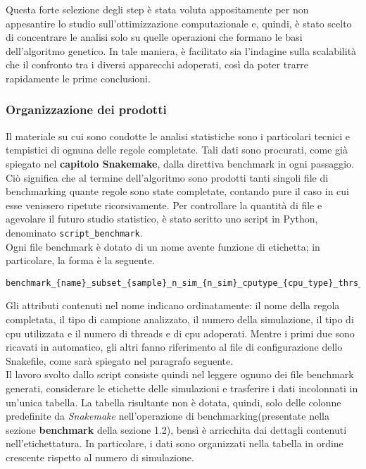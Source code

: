 Questa forte selezione degli step è stata voluta appositamente per non appesantire lo studio sull'ottimizzazione computazionale e, quindi, è stato scelto di concentrare le analisi solo su quelle operazioni che formano le basi dell'algoritmo genetico. In tale maniera, è facilitato sia l'indagine sulla scalabilità che il confronto tra i diversi apparecchi adoperati, così da poter trarre rapidamente le prime conclusioni.    


\subsubsection{Organizzazione dei prodotti}
Il materiale su cui sono condotte le analisi statistiche sono i particolari tecnici e tempistici di ognuna delle regole completate. Tali dati sono procurati, come già spiegato nel \textbf{capitolo Snakemake}, dalla direttiva benchmark in ogni passaggio. Ciò significa che al termine dell'algoritmo sono prodotti tanti singoli file di benchmarking quante regole sono state completate, contando pure il caso in cui esse venissero ripetute ricorsivamente. Per controllare la quantità di file e agevolare il futuro studio statistico, è stato scritto uno script in Python, denominato \verb!script_benchmark!. \\
Ogni file benchmark è dotato di un nome avente funzione di etichetta; in particolare, la forma è la seguente.
\begin{lstlisting}
benchmark_{name}_subset_{sample}_n_sim_{n_sim}_cputype_{cpu_type}_thrs_{thrs}_ncpu{n_cpu}.txt
\end{lstlisting}
Gli attributi contenuti nel nome indicano ordinatamente: il nome della regola completata, il tipo di campione analizzato, il numero della simulazione, il tipo di cpu utilizzata e il numero di threads e di cpu adoperati. Mentre i primi due sono ricavati in automatico, gli altri fanno riferimento al file di configurazione dello Snakefile, come sarà spiegato nel paragrafo seguente.\\ 
Il lavoro svolto dallo script consiste quindi nel leggere ognuno dei file benchmark generati, considerare le etichette delle simulazioni e trasferire i dati incolonnati in un'unica tabella. La tabella risultante non è dotata, quindi, solo delle colonne predefinite da \textit{Snakemake} nell'operazione di benchmarking(presentate nella sezione \textbf{benchmark} della sezione 1.2), bensì è arricchita dai dettagli contenuti nell'etichettatura. In particolare, i dati sono organizzati nella tabella in ordine crescente rispetto al numero di simulazione.\\ 
